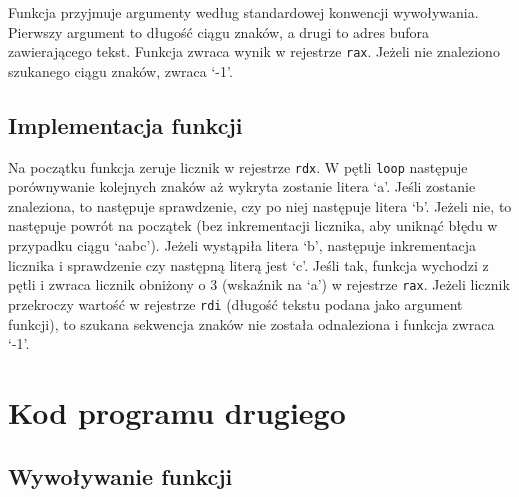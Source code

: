 \documentclass[polish, 11pt]{article}
\begin{document}
		\begin{minipage}{.5\textwidth}
			Funkcja przyjmuje argumenty według standardowej konwencji wywoływania.
			Pierwszy argument to długość ciągu znaków, a drugi to adres bufora zawierającego tekst.
			Funkcja zwraca wynik w rejestrze \texttt{rax}.
			Jeżeli nie znaleziono szukanego ciągu znaków, zwraca `-1'.
		\end{minipage}%
		\hspace{1cm}
		\begin{minipage}{.5\textwidth}
			
		\end{minipage}

	\subsection{Implementacja funkcji}
	
		\begin{minipage}{.5\textwidth}
			Na początku funkcja zeruje licznik w rejestrze \texttt{rdx}.
			W pętli \texttt{loop} następuje porównywanie kolejnych znaków aż wykryta zostanie litera `a'.
			Jeśli zostanie znaleziona, to następuje sprawdzenie, czy po niej następuje litera `b'.
			Jeżeli nie, to następuje powrót na początek (bez inkrementacji licznika, aby uniknąć błędu w przypadku ciągu `aabc').
			Jeżeli wystąpiła litera `b', następuje inkrementacja licznika i sprawdzenie czy następną literą jest `c'.
			Jeśli tak, funkcja wychodzi z pętli i zwraca licznik obniżony o 3 (wskaźnik na `a') w rejestrze \texttt{rax}.
			Jeżeli licznik przekroczy wartość w rejestrze \texttt{rdi} (długość tekstu podana jako argument funkcji),
			to szukana sekwencja znaków nie została odnaleziona i funkcja zwraca `-1'.

		\end{minipage}%
		\hspace{1cm}
		\begin{minipage}{.5\textwidth}
			
		\end{minipage}

\newpage
\section{Kod programu drugiego}
	\subsection{Wywoływanie funkcji}
			
\end{document}
